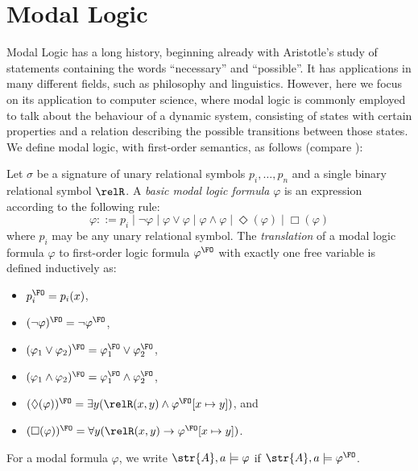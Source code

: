 \section{Modal Logic}
Modal Logic has a long history, beginning already with Aristotle's study of statements containing the words ``necessary'' and ``possible''\cite{goldblatt2006}.
It has applications in many different fields, such as philosophy and linguistics\cite{vanBenthem2010-VANMLF-4}.
However, here we focus on its application to computer science, where modal logic is commonly employed to talk about the behaviour of a dynamic system, consisting of states with certain properties and a relation describing the possible transitions between those states.
We define modal logic, with first-order semantics, as follows (compare \cite[Sec. 2.1.2]{otto2004a}):
\begin{definition}
  Let $\sigma$ be a signature of unary relational symbols $p_{i}, \ldots, p_{n}$ and a single binary relational symbol $\relR$.
  A \emph{basic modal logic formula} $\varphi$ is an expression according to the following rule:
  \begin{equation*}
    \varphi ::= p_{i}
      \mid \neg \varphi
      \mid \varphi \lor \varphi
      \mid \varphi \land \varphi
      \mid \Diamond(\varphi)
      \mid \Box(\varphi)
  \end{equation*}
  where $p_{i}$ may be any unary relational symbol.
  The \emph{translation} of a modal logic formula $\varphi$ to first-order logic formula $\varphi^{\FO}$ with exactly one free variable is defined inductively as:
  \begin{itemize}
    \item $p_{i}^{\FO} = p_{i}(x)$,
    \item $(\neg \varphi)^{\FO} = \neg \varphi^{\FO}$,
    \item $(\varphi_{1} \lor \varphi_{2})^{\FO} = \varphi_{1}^{\FO} \lor \varphi_{2}^{\FO}$,
    \item $(\varphi_{1} \land \varphi_{2})^{\FO} = \varphi_{1}^{\FO} \land \varphi_{2}^{\FO}$,
    \item $(\Diamond (\varphi))^{\FO} = \exists{y}(\relR(x,y) \land \varphi^{\FO}[x \mapsto y])$, and
    \item $(\Box (\varphi))^{\FO} = \forall{y}(\relR(x,y) \to \varphi^{\FO}[x \mapsto y])$.
  \end{itemize}
  For a modal formula $\varphi$, we write $\str{A}, a \models \varphi$ if $\str{A}, a \models \varphi^{\FO}$.
\end{definition}
